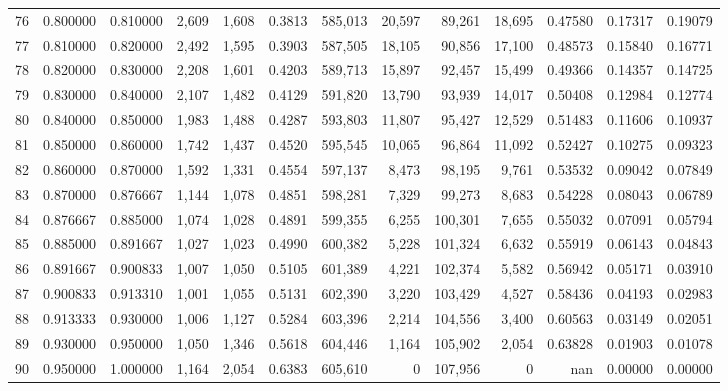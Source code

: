 \begin{tabular}{rrrrrrrrrrrrr}
76 &  0.800000 &  0.810000 &   2,609 &  1,608 &                                     0.3813 &  585,013 &   20,597 &   89,261 &   18,695 &  0.47580 &  0.17317 &  0.19079 \\
77 &  0.810000 &  0.820000 &   2,492 &  1,595 &                                     0.3903 &  587,505 &   18,105 &   90,856 &   17,100 &  0.48573 &  0.15840 &  0.16771 \\
78 &  0.820000 &  0.830000 &   2,208 &  1,601 &                                     0.4203 &  589,713 &   15,897 &   92,457 &   15,499 &  0.49366 &  0.14357 &  0.14725 \\
79 &  0.830000 &  0.840000 &   2,107 &  1,482 &                                     0.4129 &  591,820 &   13,790 &   93,939 &   14,017 &  0.50408 &  0.12984 &  0.12774 \\
80 &  0.840000 &  0.850000 &   1,983 &  1,488 &                                     0.4287 &  593,803 &   11,807 &   95,427 &   12,529 &  0.51483 &  0.11606 &  0.10937 \\
81 &  0.850000 &  0.860000 &   1,742 &  1,437 &                                     0.4520 &  595,545 &   10,065 &   96,864 &   11,092 &  0.52427 &  0.10275 &  0.09323 \\
82 &  0.860000 &  0.870000 &   1,592 &  1,331 &                                     0.4554 &  597,137 &    8,473 &   98,195 &    9,761 &  0.53532 &  0.09042 &  0.07849 \\
83 &  0.870000 &  0.876667 &   1,144 &  1,078 &                                     0.4851 &  598,281 &    7,329 &   99,273 &    8,683 &  0.54228 &  0.08043 &  0.06789 \\
84 &  0.876667 &  0.885000 &   1,074 &  1,028 &                                     0.4891 &  599,355 &    6,255 &  100,301 &    7,655 &  0.55032 &  0.07091 &  0.05794 \\
85 &  0.885000 &  0.891667 &   1,027 &  1,023 &                                     0.4990 &  600,382 &    5,228 &  101,324 &    6,632 &  0.55919 &  0.06143 &  0.04843 \\
86 &  0.891667 &  0.900833 &   1,007 &  1,050 &                                     0.5105 &  601,389 &    4,221 &  102,374 &    5,582 &  0.56942 &  0.05171 &  0.03910 \\
87 &  0.900833 &  0.913310 &   1,001 &  1,055 &                                     0.5131 &  602,390 &    3,220 &  103,429 &    4,527 &  0.58436 &  0.04193 &  0.02983 \\
88 &  0.913333 &  0.930000 &   1,006 &  1,127 &                                     0.5284 &  603,396 &    2,214 &  104,556 &    3,400 &  0.60563 &  0.03149 &  0.02051 \\
89 &  0.930000 &  0.950000 &   1,050 &  1,346 &                                     0.5618 &  604,446 &    1,164 &  105,902 &    2,054 &  0.63828 &  0.01903 &  0.01078 \\
90 &  0.950000 &  1.000000 &   1,164 &  2,054 &                                     0.6383 &  605,610 &        0 &  107,956 &        0 &      nan &  0.00000 &  0.00000 \\
\bottomrule
\end{tabular}
